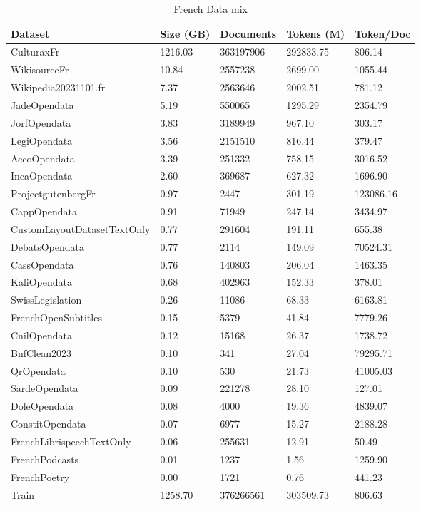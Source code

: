 \begin{table}
    \centering
        \begin{tabular}{lllll}
        \toprule
        Dataset & Size (GB) & Documents & Tokens (M) & Token/Doc \\
        \midrule
        CulturaxFr & 1216.03 & 363197906 & 292833.75 & 806.14 \\
        WikisourceFr & 10.84 & 2557238 & 2699.00 & 1055.44 \\
        Wikipedia20231101.fr & 7.37 & 2563646 & 2002.51 & 781.12 \\
        JadeOpendata & 5.19 & 550065 & 1295.29 & 2354.79 \\
        JorfOpendata & 3.83 & 3189949 & 967.10 & 303.17 \\
        LegiOpendata & 3.56 & 2151510 & 816.44 & 379.47 \\
        AccoOpendata & 3.39 & 251332 & 758.15 & 3016.52 \\
        IncaOpendata & 2.60 & 369687 & 627.32 & 1696.90 \\
        ProjectgutenbergFr & 0.97 & 2447 & 301.19 & 123086.16 \\
        CappOpendata & 0.91 & 71949 & 247.14 & 3434.97 \\
        CustomLayoutDatasetTextOnly & 0.77 & 291604 & 191.11 & 655.38 \\
        DebatsOpendata & 0.77 & 2114 & 149.09 & 70524.31 \\
        CassOpendata & 0.76 & 140803 & 206.04 & 1463.35 \\
        KaliOpendata & 0.68 & 402963 & 152.33 & 378.01 \\
        SwissLegislation & 0.26 & 11086 & 68.33 & 6163.81 \\
        FrenchOpenSubtitles & 0.15 & 5379 & 41.84 & 7779.26 \\
        CnilOpendata & 0.12 & 15168 & 26.37 & 1738.72 \\
        BnfClean2023 & 0.10 & 341 & 27.04 & 79295.71 \\
        QrOpendata & 0.10 & 530 & 21.73 & 41005.03 \\
        SardeOpendata & 0.09 & 221278 & 28.10 & 127.01 \\
        DoleOpendata & 0.08 & 4000 & 19.36 & 4839.07 \\
        ConstitOpendata & 0.07 & 6977 & 15.27 & 2188.28 \\
        FrenchLibrispeechTextOnly & 0.06 & 255631 & 12.91 & 50.49 \\
        FrenchPodcasts & 0.01 & 1237 & 1.56 & 1259.90 \\
        FrenchPoetry & 0.00 & 1721 & 0.76 & 441.23 \\
        \hline
        Train & 1258.70 & 376266561 & 303509.73 & 806.63 \\
        \bottomrule
        \end{tabular}
    \caption[French data mix]{French Data mix}
    \label{tab:tab_fr}
\end{table}


